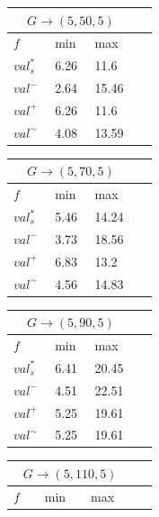 \documentclass[10pt]{article}
\begin{document}
\filbreak
\begin{center}
  \begin{tabular}{|C{0.08\linewidth}|C{0.08\linewidth}|C{0.08\linewidth}|C{0.08\linewidth}|}
    \hline
     \\ \hline
    $f$          & min  & max   \\ \hline
    $val^*_s$    & 6.26 & 11.6  \\ \hline
    ${val}^-$    & 2.64 & 15.46 \\ \hline
    ${val}^+$    & 6.26 & 11.6  \\ \hline
    ${val}^\sim$ & 4.08 & 13.59 \\ \hline
  \end{tabular}
  \begin{tabular}{|C{0.08\linewidth}|C{0.08\linewidth}|C{0.08\linewidth}|C{0.08\linewidth}|}
    \hline
     \\ \hline
    $f$          & min  & max  \\ \hline
    $val^*_s$    & 5.46 & 14.24 \\ \hline
    ${val}^-$    & 3.73 & 18.56 \\ \hline
    ${val}^+$    & 6.83 & 13.2 \\ \hline
    ${val}^\sim$ & 4.56 & 14.83 \\ \hline
  \end{tabular}
  \begin{tabular}{|C{0.08\linewidth}|C{0.08\linewidth}|C{0.08\linewidth}|C{0.08\linewidth}|}
    \hline
     \\ \hline
    $f$          & min  & max  \\ \hline
    $val^*_s$    & 6.41 & 20.45 \\ \hline
    ${val}^-$    & 4.51 & 22.51 \\ \hline
    ${val}^+$    & 5.25 & 19.61 \\ \hline
    ${val}^\sim$ & 5.25 & 19.61 \\ \hline
  \end{tabular}
  \begin{tabular}{|C{0.08\linewidth}|C{0.08\linewidth}|C{0.08\linewidth}|C{0.08\linewidth}|}
    \hline
     \\ \hline
    $f$          & min  & max  \\ \hline

\end{tabular}
\end{center}
\end{document}
